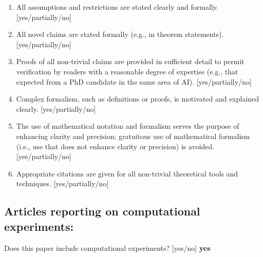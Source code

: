 \begin{enumerate}
    \item All assumptions and restrictions are stated clearly and formally.
    [yes/partially/no]
    \item All novel claims are stated formally (e.g., in theorem statements).
    [yes/partially/no]
    \item Proofs of all non-trivial claims are provided in sufficient detail to permit verification by readers with a reasonable degree of expertise (e.g., that expected from a PhD candidate in the same area of AI). [yes/partially/no]
    \item
    Complex formalism, such as definitions or proofs, is motivated and explained clearly.
    [yes/partially/no]
    \item
    The use of mathematical notation and formalism serves the purpose of enhancing clarity and precision; gratuitous use of mathematical formalism (i.e., use that does not enhance clarity or precision) is avoided.
    [yes/partially/no]
    \item
    Appropriate citations are given for all non-trivial theoretical tools and techniques.
    [yes/partially/no]
\end{enumerate}

\subsection*{Articles reporting on computational experiments:}
Does this paper include computational experiments? [yes/no] \textbf{yes}

